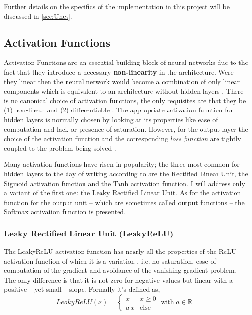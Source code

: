 Further details on the specifics of the implementation in this project will be discussed in \cref{sec:Unet}.

\subsection{Activation Functions} \label{sec:ActivationFunctions}
Activation Functions are an essential building block of neural networks due to the fact that they introduce a necessary \textbf{non-linearity} in the architecture. Were they linear then the neural network would become a combination of only linear components which is equivalent to an architecture without hidden layers \citep{Bishop2006PatternLearning}. There is no canonical choice of activation functions, the only requisites are that they be (1) non-linear and (2) differentiable \citep{Bishop2006PatternLearning,Goodfellow2016}. The appropriate activation function for hidden layers is normally chosen by looking at its properties like ease of computation and lack or presence of saturation. However, for the output layer the choice of the activation function and the corresponding \textit{loss function} are tightly coupled to the problem being solved \citep{Bishop2006PatternLearning}.

Many activation functions have risen in popularity; the three most common for hidden layers to the day of writing according to \citet{PaperswithCode2022AnCode} are the Rectified Linear Unit, the Sigmoid activation function and the Tanh activation function. I will address only a variant of the first one: the Leaky Rectified Linear Unit. As for the activation function for the output unit -- which are sometimes called output functions -- the Softmax activation function is presented.

\subsubsection{Leaky Rectified Linear Unit (LeakyReLU)}

The LeakyReLU activation function has nearly all the properties of the ReLU activation function of which it is a variation \citep{Maas2013RectifierModels}, i.e. no saturation, ease of computation of the gradient and avoidance of the vanishing gradient problem. The only difference is that it is not zero for negative values but linear with a positive -- yet small -- slope. Formally it's defined as,
\begin{equation} \label{eq:LeakyReLU}
    LeakyReLU(x) = \begin{cases} x & x\geq0 \\ a\, x & \text{else} \end{cases} \; \text{with} \; a \in \mathbb{R}^{+}
\end{equation}


